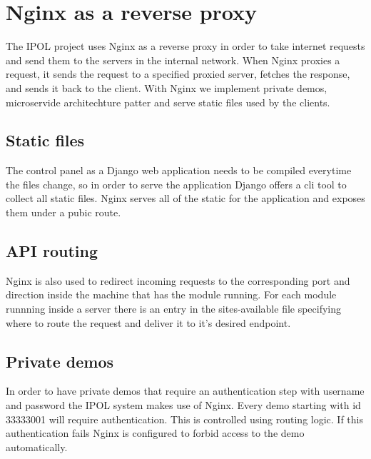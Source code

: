 
\section{Nginx as a reverse proxy}
The IPOL project uses Nginx as a reverse proxy in order to take internet requests and send them to the servers in the 
internal network. When Nginx proxies a request, it sends the request to a specified proxied server, fetches the response, 
and sends it back to the client. With Nginx we implement private demos, microservide architechture patter and serve static 
files used by the clients.

\subsection{Static files}
The control panel as a Django web application needs to be compiled everytime the files change, so in order to serve the 
application Django offers a cli tool to collect all static files. Nginx serves all of the static for the application and exposes them 
under a pubic route.

\subsection{API routing}
Nginx is also used to redirect incoming requests to the corresponding port and direction inside the machine that has the 
module running. For each module runnning inside a server there is an entry in the sites-available file specifying where to 
route the request and deliver it to it's desired endpoint.

\subsection{Private demos}
In order to have private demos that require an authentication step with username and password the IPOL system makes 
use of Nginx. Every demo starting with id 33333001 will require authentication. This is controlled using routing logic. If this 
authentication fails Nginx is configured to forbid access to the demo automatically.